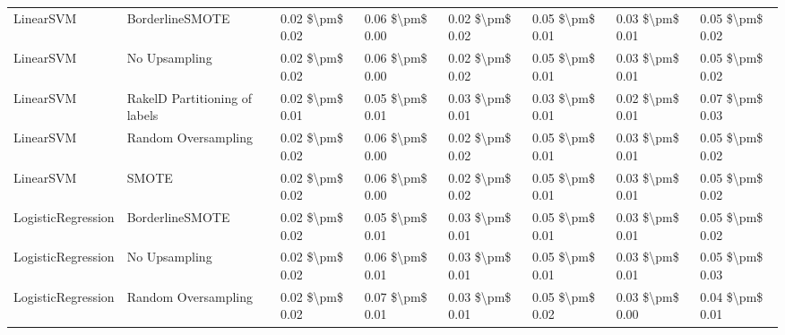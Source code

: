 \begin{tabular}{llllllll}
                      LinearSVM &               BorderlineSMOTE & 0.02 \$\textbackslash pm\$ 0.02 &           0.06 \$\textbackslash pm\$ 0.00 &       0.02 \$\textbackslash pm\$ 0.02 &        0.05 \$\textbackslash pm\$ 0.01 &                         0.03 \$\textbackslash pm\$ 0.01 & 0.05 \$\textbackslash pm\$ 0.02 \\
                      LinearSVM &                 No Upsampling & 0.02 \$\textbackslash pm\$ 0.02 &           0.06 \$\textbackslash pm\$ 0.00 &       0.02 \$\textbackslash pm\$ 0.02 &        0.05 \$\textbackslash pm\$ 0.01 &                         0.03 \$\textbackslash pm\$ 0.01 & 0.05 \$\textbackslash pm\$ 0.02 \\
                      LinearSVM & RakelD Partitioning of labels & 0.02 \$\textbackslash pm\$ 0.01 &           0.05 \$\textbackslash pm\$ 0.01 &       0.03 \$\textbackslash pm\$ 0.01 &        0.03 \$\textbackslash pm\$ 0.01 &                         0.02 \$\textbackslash pm\$ 0.01 & 0.07 \$\textbackslash pm\$ 0.03 \\
                      LinearSVM &           Random Oversampling & 0.02 \$\textbackslash pm\$ 0.02 &           0.06 \$\textbackslash pm\$ 0.00 &       0.02 \$\textbackslash pm\$ 0.02 &        0.05 \$\textbackslash pm\$ 0.01 &                         0.03 \$\textbackslash pm\$ 0.01 & 0.05 \$\textbackslash pm\$ 0.02 \\
                      LinearSVM &                         SMOTE & 0.02 \$\textbackslash pm\$ 0.02 &           0.06 \$\textbackslash pm\$ 0.00 &       0.02 \$\textbackslash pm\$ 0.02 &        0.05 \$\textbackslash pm\$ 0.01 &                         0.03 \$\textbackslash pm\$ 0.01 & 0.05 \$\textbackslash pm\$ 0.02 \\
             LogisticRegression &               BorderlineSMOTE & 0.02 \$\textbackslash pm\$ 0.02 &           0.05 \$\textbackslash pm\$ 0.01 &       0.03 \$\textbackslash pm\$ 0.01 &        0.05 \$\textbackslash pm\$ 0.01 &                         0.03 \$\textbackslash pm\$ 0.01 & 0.05 \$\textbackslash pm\$ 0.02 \\
             LogisticRegression &                 No Upsampling & 0.02 \$\textbackslash pm\$ 0.02 &           0.06 \$\textbackslash pm\$ 0.01 &       0.03 \$\textbackslash pm\$ 0.01 &        0.05 \$\textbackslash pm\$ 0.01 &                         0.03 \$\textbackslash pm\$ 0.01 & 0.05 \$\textbackslash pm\$ 0.03 \\
             LogisticRegression &           Random Oversampling & 0.02 \$\textbackslash pm\$ 0.02 &           0.07 \$\textbackslash pm\$ 0.01 &       0.03 \$\textbackslash pm\$ 0.01 &        0.05 \$\textbackslash pm\$ 0.02 &                         0.03 \$\textbackslash pm\$ 0.00 & 0.04 \$\textbackslash pm\$ 0.01 \\

\end{tabular}
